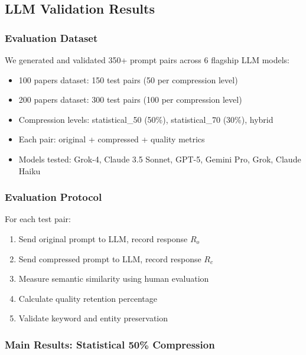 \subsection{LLM Validation Results}

\subsubsection{Evaluation Dataset}

We generated and validated 350+ prompt pairs across 6 flagship LLM models:

\begin{itemize}
    \item 100 papers dataset: 150 test pairs (50 per compression level)
    \item 200 papers dataset: 300 test pairs (100 per compression level)
    \item Compression levels: statistical\_50 (50\%), statistical\_70 (30\%), hybrid
    \item Each pair: original + compressed + quality metrics
    \item Models tested: Grok-4, Claude 3.5 Sonnet, GPT-5, Gemini Pro, Grok, Claude Haiku
\end{itemize}

\subsubsection{Evaluation Protocol}

For each test pair:
\begin{enumerate}
    \item Send original prompt to LLM, record response $R_o$
    \item Send compressed prompt to LLM, record response $R_c$
    \item Measure semantic similarity using human evaluation
    \item Calculate quality retention percentage
    \item Validate keyword and entity preservation
\end{enumerate}

\subsubsection{Main Results: Statistical 50\% Compression}

